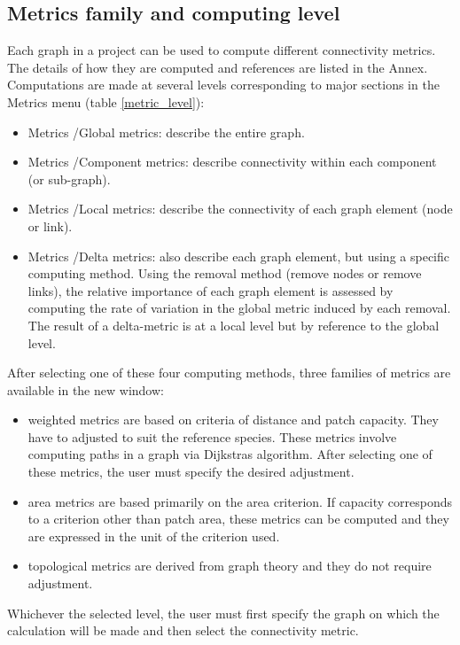 \documentclass{article}
\begin{document}
\subsection{Metrics family and computing level}
\label{metric_fam}
Each graph in a project can be used to compute different connectivity metrics. The details of how they are computed and references are listed in the Annex. Computations are made at several levels corresponding to major sections in the Metrics menu (table \ref{metric_level}):
\begin{itemize}
	\item Metrics /Global metrics: describe the entire graph.
	\item Metrics /Component metrics: describe connectivity within each component (or sub-graph).
	\item Metrics /Local metrics: describe the connectivity of each graph element (node or link).
	\item Metrics /Delta metrics: also describe each graph element, but using a specific computing method. Using the removal method (remove nodes or remove links), the relative importance of each graph element is assessed by computing the rate of variation in the global metric induced by each removal. The result of a delta-metric is at a local level but by reference to the global level.
\end{itemize}

After selecting one of these four computing methods, three families of
metrics are available in the new window: 
\begin{itemize}
	\item weighted metrics are based on criteria of distance and patch capacity. They have to adjusted to suit the reference species. These metrics involve computing paths in a graph via Dijkstra{\textquotesingle}s algorithm. After selecting one of these metrics, the user must specify the desired adjustment.
	\item area metrics are based primarily on the area criterion. If capacity corresponds to a criterion other than patch area, these metrics can be computed and they are expressed in the unit of the criterion used.
	\item topological metrics are derived from graph theory and they do not require adjustment.
\end{itemize}

Whichever the selected level, the user must first specify the graph on which the calculation will be made and then select the connectivity metric.
\end{document}
